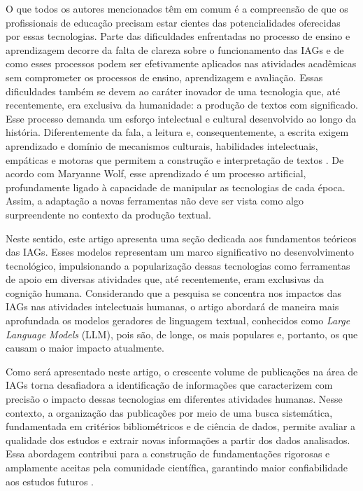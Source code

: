 \documentclass[openany,oneside,a4paper,11pt]{extarticle}
\begin{document}
O que todos os autores mencionados têm em comum é a compreensão de que os profissionais de educação precisam estar cientes das potencialidades oferecidas por essas tecnologias. Parte das dificuldades enfrentadas no processo de ensino e aprendizagem decorre da falta de clareza sobre o funcionamento das IAGs e de como esses processos podem ser efetivamente aplicados nas atividades acadêmicas sem comprometer os processos de ensino, aprendizagem e avaliação. Essas dificuldades também se devem ao caráter inovador de uma tecnologia que, até recentemente, era exclusiva da humanidade: a produção de textos com significado. Esse processo demanda um esforço intelectual e cultural desenvolvido ao longo da história. Diferentemente da fala, a leitura e, consequentemente, a escrita exigem aprendizado e domínio de mecanismos culturais, habilidades intelectuais, empáticas e motoras que permitem a construção e interpretação de textos \cite{Wolf2019}. De acordo com Maryanne Wolf, esse aprendizado é um processo artificial, profundamente ligado à capacidade de manipular as tecnologias de cada época. Assim, a adaptação a novas ferramentas não deve ser vista como algo surpreendente no contexto da produção textual.

Neste sentido, este artigo apresenta uma seção dedicada aos fundamentos teóricos das IAGs. Esses modelos representam um marco significativo no desenvolvimento tecnológico, impulsionando a popularização dessas tecnologias como ferramentas de apoio em diversas atividades que, até recentemente, eram exclusivas da cognição humana. Considerando que a pesquisa se concentra nos impactos das IAGs nas atividades intelectuais humanas, o artigo abordará de maneira mais aprofundada os modelos geradores de linguagem textual, conhecidos como \textit{Large Language Models} (LLM), pois são, de longe, os mais populares e, portanto, os que causam o maior impacto atualmente.

Como será apresentado neste artigo, o crescente volume de publicações na área de IAGs torna desafiadora a identificação de informações que caracterizem com precisão o impacto dessas tecnologias em diferentes atividades humanas. Nesse contexto, a organização das publicações por meio de uma busca sistemática, fundamentada em critérios bibliométricos e de ciência de dados, permite avaliar a qualidade dos estudos e extrair novas informações a partir dos dados analisados. Essa abordagem contribui para a construção de fundamentações rigorosas e amplamente aceitas pela comunidade científica, garantindo maior confiabilidade aos estudos futuros \cite{ferreira2010bibliometria}.
\end{document}
